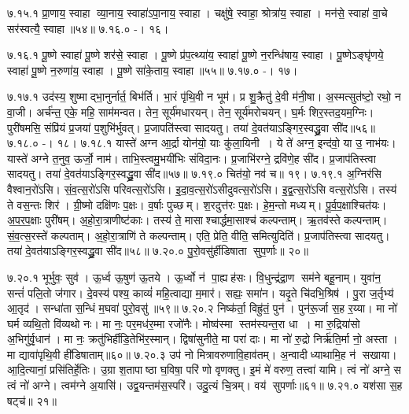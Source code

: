 ७.१५.१
प्रा॒णाय॒ स्वाहा व्या॒नाय॒ स्वाहा॑ऽपा॒नाय॒ स्वाहा। चक्षु॑षे॒ स्वाहा॒ श्रोत्रा॑य॒ स्वाहा। मन॑से॒ स्वाहा॑ वा॒चे सर॑स्वत्यै॒ स्वाहा॥५४॥
७.१६.०
-। १६।
\anuvakamend


७.१६.१
पू॒ष्णे स्वाहा॑ पू॒ष्णे शर॑से॒ स्वाहा। पू॒ष्णे प्र॑प॒त्थ्या॑य॒ स्वाहा॑ पू॒ष्णे न॒रन्धि॑षाय॒ स्वाहा। पू॒ष्णेऽङ्घृ॑णये॒ स्वाहा॑ पू॒ष्णे न॒रुणा॑य॒ स्वाहा। पू॒ष्णे सा॑के॒ताय॒ स्वाहा॥५५॥
७.१७.०
-। १७।
\anuvakamend

७.१७.१
उद॑स्य॒ शुष्माद्भा॒नुर्नार्त॒ बिभ॑र्ति। भा॒रं पृ॑थि॒वी न भूम॑। प्र शु॒क्रैतु॑ दे॒वी म॑नी॒षा। अ॒स्मत्सुत॑ष्टो॒ रथो॒ न वा॒जी। अर्च॑न्त॒ एके॒ महि॒ साम॑मन्वत। तेन॒ सूर्य॑मधारयन्। तेन॒ सूर्य॑मरोचयन्। घ॒र्मः  शिर॒स्तद॒यम॒ग्निः। पुरी॑षमसि॒ संप्रि॑यं प्र॒जया॑ प॒शुभि॑र्भुवत्। प्र॒जापति॑स्त्वा सादयतु। तया॑ दे॒वत॑याऽङ्गिर॒स्वद्ध्रु॒वा सी॑द॥५६॥
७.१८.०
-। १८।
\anuvakamend
७.१८.१
यास्ते॑ अग्न आ॒र्द्रा योन॑यो॒ याः कु॑ला॒यिनी। ये ते॑ अग्न॒ इन्द॑वो॒ या उ॒ नाभ॑यः। यास्ते॑ अग्ने त॒नुव॒ ऊर्जो॒ नाम॑। ताभि॒स्त्वमु॒भयी॑भिः संविदा॒नः। प्र॒जाभि॑रग्ने॒ द्रवि॑णे॒ह सी॑द। प्र॒जाप॑तिस्त्वा सादयतु। तया॑ दे॒वत॑याऽङ्गिर॒स्वद्ध्रु॒वा सी॑द॥५७॥
७.१९.०
चित॑यो॒ नव॑ च॥ १९।
\anuvakamend
७.१९.१
अ॒ग्निर॑सि वैश्वान॒रो॑ऽसि। सं॒व॒त्स॒रो॑ऽसि परिवत्स॒रो॑ऽसि। इ॒दा॒व॒त्स॒रो॑ऽसीदुवत्स॒रो॑ऽसि। इ॒द्व॒त्स॒रो॑ऽसि वत्स॒रो॑ऽसि। तस्य॑ ते वस॒न्तः  शिर॑। ग्री॒ष्मो दक्षि॑णः प॒क्षः। व॒र्\mbox{}षाः पुच्छम्। श॒रदुत्त॑रः प॒क्षः। हे॒म॒न्तो मध्यम्। पू॒र्व॒प॒क्षाश्चित॑यः। अ॒प॒र॒प॒क्षाः पुरी॑षम्। अ॒हो॒रा॒त्राणीष्ट॑काः। तस्य॑ ते॒ मासाश्चार्द्धमा॒साश्च॑ कल्पन्ताम्। ऋ॒तव॑स्ते कल्पन्ताम्। सं॒व॒त्स॒रस्ते॑ कल्पताम्। अ॒हो॒रा॒त्राणि॑ ते कल्पन्ताम्। एति॒ प्रेति॒ वीति॒ समित्युदिति॑। प्र॒जाप॑तिस्त्वा सादयतु। तया॑ दे॒वत॑याऽङ्गिर॒स्वद्ध्रु॒वा सी॑द॥५८॥
७.२०.०
पु॒रो॒वसु॑र्\mbox{}हीडिषाता सुप॒र्णाः॥ २०॥
\anuvakamend

७.२०.१
भूर्भुवः॒ सुव॑। ऊ॒र्ध्व ऊ॒षुण॑ ऊ॒तये। ऊ॒र्ध्वो न॑ पा॒ह्यह॑सः। वि॒धुन्द्र॑द्रा॒ण सम॑ने बहू॒नाम्। युवा॑न॒ सन्तं॑ पलि॒तो ज॑गार। दे॒वस्य॑ पश्य॒ काव्यं॑ महि॒त्वाद्या म॒मार॑। सह्यः॒ समा॑न। यदृ॒ते चि॑दभि॒श्रिष॑। पु॒रा ज॒र्तृभ्य॑ आ॒तृद॑। सन्धा॑ता स॒न्धिं म॒घवा॑ पुरो॒वसु॑॥५९॥
७.२०.२
निष्क॑र्ता॒ विह्रु॑तं॒ पुन॑। पुन॑रू॒र्जा स॒ह र॒य्या। मा नो॑ घर्म व्यथि॒तो वि॑व्यथो नः। मा नः॒ पर॒मध॑र॒म्मा रजो॑नैः। मोष्व॑स्मा स्तम॑स्यन्त॒रा धा। मा रु॒द्रिया॑सो अ॒भिगु॑र्वृ॒धान॑। मा नः॒ क्रतु॑भिर्\mbox{}हीडि॒तेभि॑र॒स्मान्। द्विषा॑सुनीते॒ मा परा॑ दाः। मा नो॑ रु॒द्रो निर्\mbox{}ऋ॑ति॒र्मा नो॒ अस्ता। मा द्यावा॑पृथि॒वी ही॑डिषाताम्॥६०॥
७.२०.३
उप॑ नो मित्रावरुणावि॒हाव॑तम्। अ॒न्वादीध्याथामि॒ह न॑ सखाया। आ॒दि॒त्यानां॒ प्रसि॑तिर्\mbox{}हे॒तिः। उ॒ग्रा श॒तापाष्ठा घ॒विषा॒ परि॑ णो वृणक्तु। इ॒मं मे॑ वरुण॒ तत्त्वा॑ यामि। त्वं नो॑ अग्ने॒ स त्वं नो॑ अग्ने। त्वम॑ग्ने अ॒यासि॑। उद्व॒यन्तम॑स॒स्परि॑। उदु॒त्यं चि॒त्रम्। वय॑ सुपर्णाः॥६१॥
७.२१.०
यश॑सा स॒ह षट्च॑॥ २१॥
\anuvakamend

